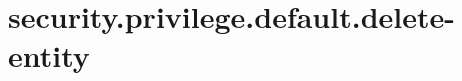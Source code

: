 \section{security.privilege.default.delete-entity}
\label{configuration:SecurityPrivilegeDefaultDeleteEntity}
\TODO
